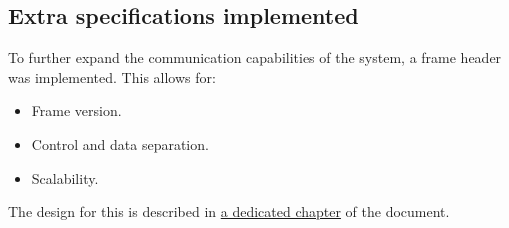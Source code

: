 \subsection{Extra specifications implemented}

To further expand the communication capabilities of the system, a frame header was implemented. This allows for:
\begin{itemize}
    \item Frame version.
    \item Control and data separation.
    \item Scalability.
\end{itemize}

The design for this is described in \hyperref[advanced]{a dedicated chapter} of the document.